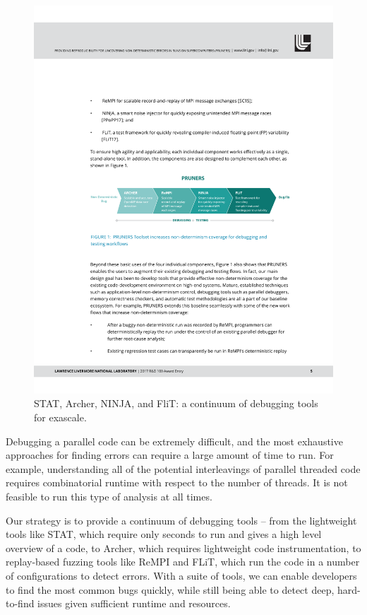 \begin{figure}[htb]
\centering
\includegraphics[width=\textwidth]{projects/2.3.6-NNSA/2.3.6.02-LLNL-ATDM/pruners}
\caption{
STAT, Archer, NINJA, and FliT: a continuum of debugging tools for exascale.
}
\end{figure}

Debugging a parallel code can be extremely difficult, and the most
exhaustive approaches for finding errors can require a large amount of
time to run.  For example, understanding all of the potential
interleavings of parallel threaded code requires combinatorial runtime
with respect to the number of threads.  It is not feasible to run this
type of analysis at all times.

Our strategy is to provide a continuum of debugging tools -- from the
lightweight tools like STAT, which require only seconds to run and gives
a high level overview of a code, to Archer, which requires lightweight
code instrumentation, to replay-based fuzzing tools like ReMPI and FLiT,
which run the code in a number of configurations to detect errors.  With
a suite of tools, we can enable developers to find the most common bugs
quickly, while still being able to detect deep, hard-to-find issues given
sufficient runtime and resources.

